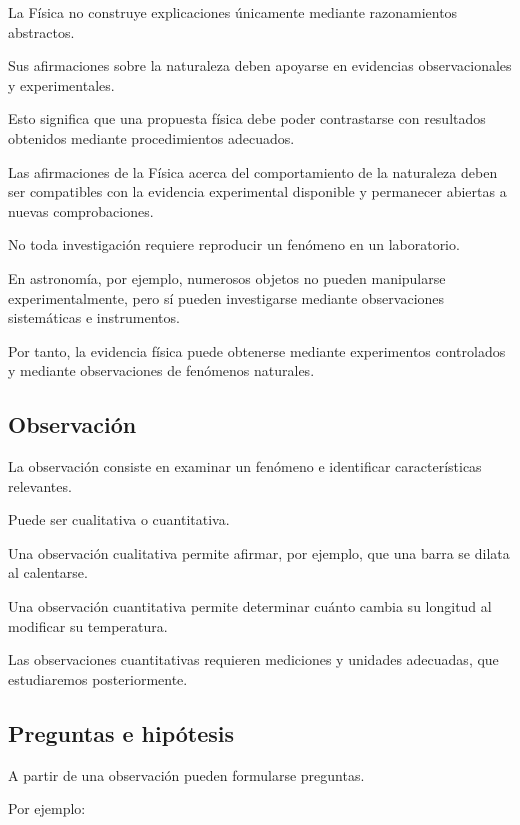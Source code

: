 La Física no construye explicaciones únicamente mediante
razonamientos abstractos.

Sus afirmaciones sobre la naturaleza deben apoyarse
en evidencias observacionales y experimentales.

Esto significa que una propuesta física debe poder
contrastarse con resultados obtenidos mediante
procedimientos adecuados.

\begin{principio}

Las afirmaciones de la Física acerca del comportamiento
de la naturaleza deben ser compatibles con la evidencia
experimental disponible y permanecer abiertas
a nuevas comprobaciones.

\end{principio}

No toda investigación requiere reproducir un fenómeno
en un laboratorio.

En astronomía, por ejemplo, numerosos objetos no pueden
manipularse experimentalmente, pero sí pueden investigarse
mediante observaciones sistemáticas e instrumentos.

Por tanto, la evidencia física puede obtenerse
mediante experimentos controlados y mediante
observaciones de fenómenos naturales.


\subsection{Observación}

La observación consiste en examinar un fenómeno
e identificar características relevantes.

Puede ser cualitativa o cuantitativa.

Una observación cualitativa permite afirmar,
por ejemplo, que una barra se dilata al calentarse.

Una observación cuantitativa permite determinar
cuánto cambia su longitud al modificar su temperatura.

Las observaciones cuantitativas requieren mediciones
y unidades adecuadas, que estudiaremos posteriormente.

\subsection{Preguntas e hipótesis}

A partir de una observación pueden formularse preguntas.

Por ejemplo:

